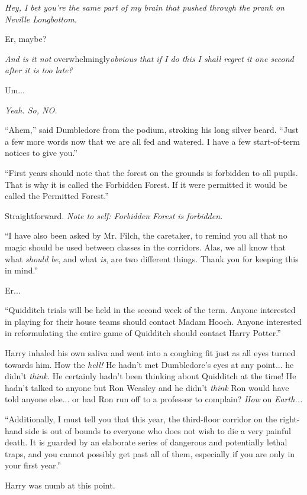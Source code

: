 \emph{Hey, I bet you're the same part of my brain that pushed through
the prank on Neville Longbottom.}

Er, maybe?

\emph{And is it not} overwhelmingly\emph{obvious that if I do this I
shall regret it one second after it is too late?}

Um...

\emph{Yeah. So, NO.}

``Ahem,'' said Dumbledore from the podium, stroking his long silver
beard. ``Just a few more words now that we are all fed and watered. I
have a few start-of-term notices to give you.''

``First years should note that the forest on the grounds is forbidden to
all pupils. That is why it is called the Forbidden Forest. If it were
permitted it would be called the Permitted Forest.''

Straightforward. \emph{Note to self: Forbidden Forest is forbidden.}

``I have also been asked by Mr. Filch, the caretaker, to remind you all
that no magic should be used between classes in the corridors. Alas, we
all know that what \emph{should be}, and what \emph{is}, are two
different things. Thank you for keeping this in mind.''

Er...

``Quidditch trials will be held in the second week of the term. Anyone
interested in playing for their house teams should contact Madam Hooch.
Anyone interested in reformulating the entire game of Quidditch should
contact Harry Potter.''

Harry inhaled his own saliva and went into a coughing fit just as all
eyes turned towards him. How the \emph{hell!} He hadn't met Dumbledore's
eyes at any point... he didn't \emph{think.} He certainly hadn't
been thinking about Quidditch at the time! He hadn't talked to anyone
but Ron Weasley and he didn't \emph{think} Ron would have told anyone
else... or had Ron run off to a professor to complain? \emph{How}
on \emph{Earth...}

``Additionally, I must tell you that this year, the third-floor corridor
on the right-hand side is out of bounds to everyone who does not wish to
die a very painful death. It is guarded by an elaborate series of
dangerous and potentially lethal traps, and you cannot possibly get past
all of them, especially if you are only in your first year.''

Harry was numb at this point.


